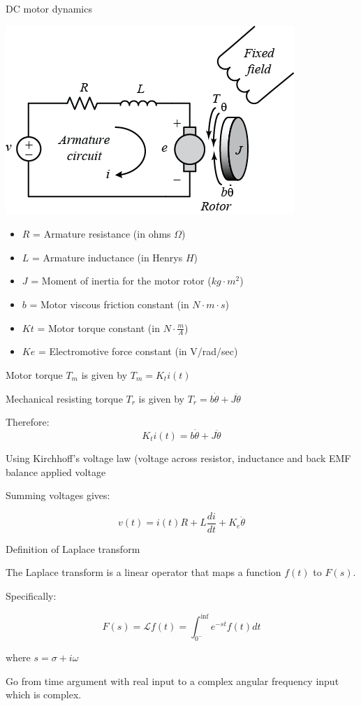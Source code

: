 \documentclass[compress]{beamer}
\begin{document}
\begin{frame}{DC motor dynamics}

    \begin{center}
        \includegraphics[width=0.5\linewidth]{image63}
    \end{center}

 {
\begin{itemize}

\item $R$ = Armature resistance (in ohms $\Omega$)
\item $L$ = Armature inductance (in Henrys $H$) %
\item $J$ = Moment of inertia for the motor rotor ($kg\cdot m^2$)
\item $b$ = Motor viscous friction constant (in $N\cdot m\cdot s$)
\item $Kt$ = Motor torque constant (in $N\cdot \frac{m}{A}$)
\item $Ke$ = Electromotive force constant (in V/rad/sec) %
\end{itemize}
}
     {
    Motor torque $T_m$ is given by $T_m = K_t i(t)$

Mechanical resisting torque $T_r$ is given by $T_r = b \dot\theta + J \ddot\theta$

Therefore:
\[
    K_t i(t) = b \dot\theta + J \ddot\theta
\]

}
     {

Using Kirchhoff's voltage law (voltage across resistor, inductance and
  back EMF balance applied voltage

Summing voltages gives:

    \[
        v(t) = i(t) R + L \frac{di}{dt} + K_e \dot\theta
        \]
}
\end{frame}

\begin{frame}{Definition of Laplace transform}

The Laplace transform is a linear operator that maps a function $f(t)$ to
$F(s)$.

Specifically:

\[
F(s) = \mathcal{L} {f(t)} = \int^{\inf}_{0^-} e^{-st}f(t)dt
\]

where $s = \sigma + i\omega$

Go from time argument with real input to a complex angular frequency
input which is complex.

\end{frame}
\end{document}
